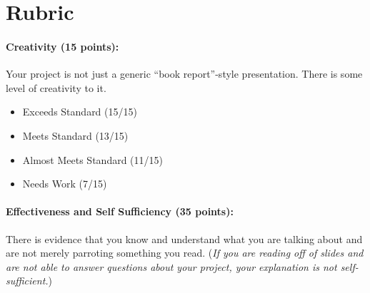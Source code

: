 \documentclass[10pt]{exam}
\begin{document}





\pagebreak



\section*{Rubric}

\paragraph{Creativity (15 points):} 
  Your project is not just a generic ``book report''-style presentation.  There is some level of creativity to it.

\begin{itemize}
  \item Exceeds Standard (15/15)
  \item Meets Standard (13/15)
  \item Almost Meets Standard (11/15)
  \item Needs Work (7/15)
  
\end{itemize}




\paragraph{Effectiveness and Self Sufficiency (35 points):} 
  There is evidence that you know and understand what you are talking about and are not merely parroting something you read.  (\emph{If you are reading off of slides and are not able to answer questions about your project, your explanation is not self-sufficient.})
\end{document}
